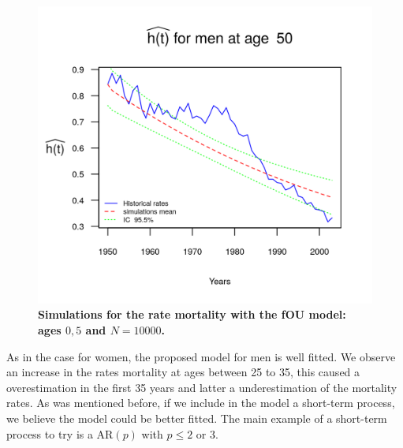 \documentclass[smallextended]{svjour3}
\begin{document}
\begin{figure}[H]
    \includegraphics{PlotMen50.png}
    \caption{\bf Simulations for the rate mortality with the fOU model: ages
    $0,5$ and $N=10000$.}
    \label{graph-simu_FOU3}
\end{figure}\vspace*{0.1cm}

As in the case for women, the proposed model for men is well fitted.
We observe an increase in the rates mortality at ages between 25 to 35, this
caused a overestimation in the first 35 years and latter a underestimation
of the mortality rates. As was mentioned before, if we include in the model a
short-term process,  we believe the model could be better fitted. The main
example  of a short-term process to try is a AR$(p)$ with $p\le 2$ or $3$.
\end{document}
